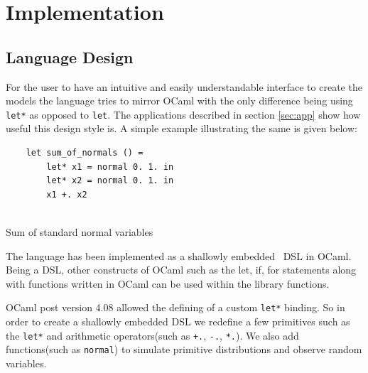 \documentclass[a4paper,11pt]{article}
\theoremstyle{mytheor}
\begin{document}
\section{Implementation}
    
    \subsection{Language Design}
    
    For the user to have an intuitive and easily understandable interface to create the models the language tries to mirror OCaml with the only difference being using \lstinline{let*} as opposed to \lstinline{let}. The applications described in section \ref{sec:app} show how useful this design style is. A simple example illustrating the same is given below:
    
    \begin{listing}[H]\centering
    \begin{verbatim}
    let sum_of_normals () = 
    	let* x1 = normal 0. 1. in
    	let* x2 = normal 0. 1. in
    	x1 +. x2
    
    \end{verbatim}
    
    \caption{Sum of standard normal variables}
    \end{listing}
    
    
    
    
    The language has been implemented as a shallowly embedded~\cite{dsl} DSL in OCaml. Being a DSL, other constructs of OCaml such as the let, if, for statements along with functions written in OCaml can be used within the library functions.
    
    OCaml post version 4.08 allowed the defining of a custom \lstinline{let*} binding. So in order to create a shallowly embedded DSL we redefine a few primitives such as the \lstinline{let*} and arithmetic operators(such as \lstinline{+.}, \lstinline{-.}, \lstinline{*.}). We also add functions(such as \lstinline{normal}) to simulate primitive distributions and observe random variables.
    
\end{document}
